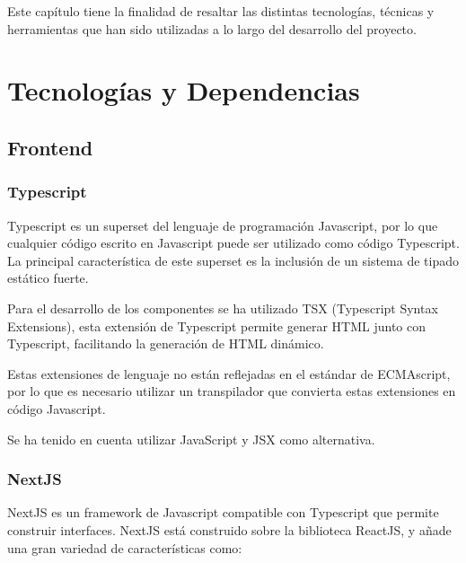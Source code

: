 
Este capítulo tiene la finalidad de resaltar las distintas tecnologías, técnicas y herramientas que han sido utilizadas a lo largo del desarrollo del proyecto. 
\vspace{-0.35cm}



\hypertarget{tecnologuxedas-y-dependencias}{%
\section{Tecnologías y
Dependencias}\label{tecnologuxedas-y-dependencias}}

\hypertarget{frontend}{%
\subsection{Frontend}\label{frontend}}

\hypertarget{typescript}{%
\subsubsection{\texorpdfstring{Typescript
}{Typescript }}\label{typescript}}

Typescript es un superset del lenguaje de programación Javascript, por
lo que cualquier código escrito en Javascript puede ser utilizado como
código Typescript. La principal característica de este superset es la
inclusión de un sistema de tipado estático fuerte.

Para el desarrollo de los componentes se ha utilizado TSX (Typescript
Syntax Extensions), esta extensión de Typescript permite generar HTML
junto con Typescript, facilitando la generación de HTML dinámico.

Estas extensiones de lenguaje no están reflejadas en el estándar de
ECMAscript, por lo que es necesario utilizar un transpilador que
convierta estas extensiones en código Javascript.

Se ha tenido en cuenta utilizar JavaScript y JSX como alternativa.

\hypertarget{nextjs}{%
\subsubsection{NextJS}\label{nextjs}}

NextJS es un framework de Javascript compatible con Typescript que
permite construir interfaces. NextJS está construido sobre la biblioteca
ReactJS, y añade una gran variedad de características como:

